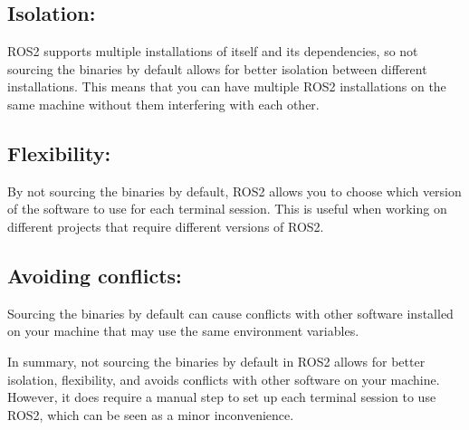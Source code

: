 \documentclass[
  letterpaper,
  DIV=11,
  numbers=noendperiod]{scrreprt}
\begin{document}
\hypertarget{isolation}{%
\subsection{Isolation:}\label{isolation}}

ROS2 supports multiple installations of itself and its dependencies, so
not sourcing the binaries by default allows for better isolation between
different installations. This means that you can have multiple ROS2
installations on the same machine without them interfering with each
other.

\hypertarget{flexibility}{%
\subsection{Flexibility:}\label{flexibility}}

By not sourcing the binaries by default, ROS2 allows you to choose which
version of the software to use for each terminal session. This is useful
when working on different projects that require different versions of
ROS2.

\hypertarget{avoiding-conflicts}{%
\subsection{Avoiding conflicts:}\label{avoiding-conflicts}}

Sourcing the binaries by default can cause conflicts with other software
installed on your machine that may use the same environment variables.

In summary, not sourcing the binaries by default in ROS2 allows for
better isolation, flexibility, and avoids conflicts with other software
on your machine. However, it does require a manual step to set up each
terminal session to use ROS2, which can be seen as a minor
inconvenience.
\end{document}
